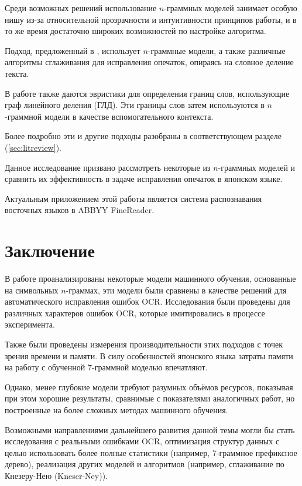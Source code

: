 \documentclass[14pt,russian]{extreport}
\theoremstyle{definition}
\begin{document}
Среди возможных решений использование $n$-граммных моделей занимает особую нишу из-за относительной прозрачности и интуитивности принципов работы, и в то же время достаточно широких возможностей по настройке алгоритма.

Подход, предложенный в \cite{nagata:shape}, использует $n$-граммные модели, а также различные алгоритмы сглаживания для исправления опечаток, опираясь на словное деление текста. 

В работе \cite{nagata:context} также даются эвристики для определения границ слов, использующие граф линейного деления (ГЛД). Эти границы слов затем используются в $n$-граммной модели в качестве вспомогательного контекста.

Более подробно эти и другие подходы разобраны в соответствующем разделе (\cref{sec:litreview}).

Данное исследование призвано рассмотреть некоторые из $n$-граммных моделей и сравнить их эффективность в задаче исправления опечаток в японском языке.

Актуальным приложением этой работы является система распознавания восточных языков в ABBYY FineReader.

\newpage


\newpage


\newpage


\newpage


\newpage


\newpage


\newpage


\newpage
\section{ Заключение }\label{sec:epilogue}

В работе проанализированы некоторые модели машинного обучения, основанные на символьных $n$-граммах, эти модели были сравнены в качестве решений для автоматического исправления ошибок OCR. Исследования были проведены для различных характеров ошибок OCR, которые имитировались в процессе эксперимента.

Также были проведены измерения производительности этих подходов с точек зрения времени и памяти. В силу особенностей японского языка затраты памяти на работу с обученной 7-граммной моделью впечатляют.

Однако, менее глубокие модели требуют разумных объёмов ресурсов, показывая при этом хорошие результаты, сравнимые с показателями аналогичных работ, но построенные на более сложных методах машинного обучения.

Возможными направлениями дальнейшего развития данной темы могли бы стать исследования с реальными ошибками OCR, оптимизация структур данных с целью использовать более полные статистики (например, 7-граммное префиксное дерево), реализация других моделей и алгоритмов (например, сглаживание по Кнезеру-Нею (Kneser-Ney)).

\newpage


\newpage

\end{document}
